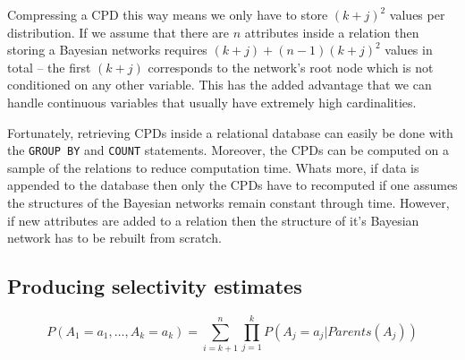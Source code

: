 \documentclass[runningheads]{llncs}
\begin{document}
Compressing a CPD this way means we only have to store $(k+j)^2$ values per distribution. If we assume that there are $n$ attributes inside a relation then storing a Bayesian networks requires $(k+j) + (n-1)(k+j)^2$ values in total -- the first $(k+j)$ corresponds to the network's root node which is not conditioned on any other variable. This has the added advantage that we can handle continuous variables that usually have extremely high cardinalities.

Fortunately, retrieving CPDs inside a relational database can easily be done with the \texttt{GROUP BY} and \texttt{COUNT} statements. Moreover, the CPDs can be computed on a sample of the relations to reduce computation time. Whats more, if data is appended to the database then only the CPDs have to recomputed if one assumes the structures of the Bayesian networks remain constant through time. However, if new attributes are added to a relation then the structure of it's Bayesian network has to be rebuilt from scratch.   

\subsection{Producing selectivity estimates} \label{sec:inference}



\begin{equation}
    \label{inference}
    P(A_1=a_1, \dots, A_k=a_k) = \sum_{i=k+1}^n\prod_{j=1}^{k} P(A_j=a_j | Parents(A_j))
\end{equation}


\end{document}

